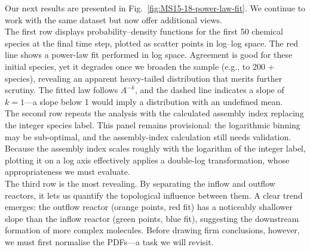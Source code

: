 \documentclass[11pt]{article}
\begin{document}
Our next results are presented in Fig.~\ref{fig:MS15-18-power-law-fit}. We continue to work with the same dataset but now offer additional views.\\

The first row displays probability–density functions for the first 50 chemical species at the final time step, plotted as scatter points in log–log space. The red line shows a power-law fit performed in log space. Agreement is good for these initial species, yet it degrades once we broaden the sample (e.g., to 200 + species), revealing an apparent heavy-tailed distribution that merits further scrutiny. The fitted law follows $A^{-k}$, and the dashed line indicates a slope of $k=1$—a slope below 1 would imply a distribution with an undefined mean.\\

The second row repeats the analysis with the calculated assembly index replacing the integer species label. This panel remains provisional: the logarithmic binning may be sub-optimal, and the assembly-index calculation still needs validation. Because the assembly index scales roughly with the logarithm of the integer label, plotting it on a log axis effectively applies a double-log transformation, whose appropriateness we must evaluate.\\

The third row is the most revealing. By separating the inflow and outflow reactors, it lets us quantify the topological influence between them. A clear trend emerges: the outflow reactor (orange points, red fit) has a noticeably shallower slope than the inflow reactor (green points, blue fit), suggesting the downstream formation of more complex molecules. Before drawing firm conclusions, however, we must first normalise the PDFs—a task we will revisit.\\

\clearpage
\end{document}
